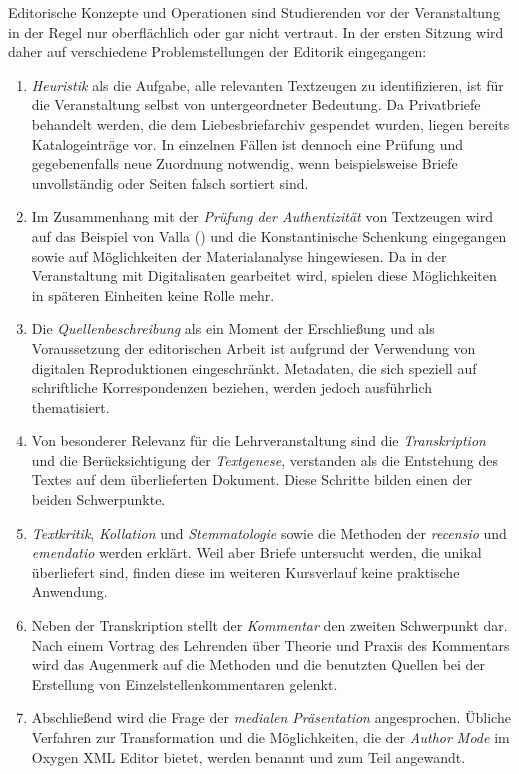 \documentclass[
          a4paper,
        ]{article}
\begin{document}
Editorische Konzepte und Operationen sind Studierenden vor der
Veranstaltung in der Regel nur oberflächlich oder gar nicht vertraut. In
der ersten Sitzung wird daher auf verschiedene Problemstellungen der
Editorik eingegangen:

\begin{enumerate}
\def\labelenumi{\arabic{enumi}.}
\item
  \emph{Heuristik} als die Aufgabe, alle relevanten Textzeugen zu
  identifizieren, ist für die Veranstaltung selbst von untergeordneter
  Bedeutung. Da Privatbriefe behandelt werden, die dem Liebesbriefarchiv
  gespendet wurden, liegen bereits Katalogeinträge vor. In einzelnen
  Fällen ist dennoch eine Prüfung und gegebenenfalls neue Zuordnung
  notwendig, wenn beispielsweise Briefe unvollständig oder Seiten falsch
  sortiert sind.
\item
  Im Zusammenhang mit der \emph{Prüfung der Authentizität} von
  Textzeugen wird auf das Beispiel von Valla
  () und die Konstantinische Schenkung
  eingegangen sowie auf Möglichkeiten der Materialanalyse hingewiesen.
  Da in der Veranstaltung mit Digitalisaten gearbeitet wird, spielen
  diese Möglichkeiten in späteren Einheiten keine Rolle mehr.
\item
  Die \emph{Quellenbeschreibung} als ein Moment der Erschließung und als
  Voraussetzung der editorischen Arbeit ist aufgrund der Verwendung von
  digitalen Reproduktionen eingeschränkt. Metadaten, die sich speziell
  auf schriftliche Korrespondenzen beziehen, werden jedoch ausführlich
  thematisiert.
\item
  Von besonderer Relevanz für die Lehrveranstaltung sind die
  \emph{Transkription} und die Berücksichtigung der \emph{Textgenese},
  verstanden als die Entstehung des Textes auf dem überlieferten
  Dokument. Diese Schritte bilden einen der beiden Schwerpunkte.
\item
  \emph{Textkritik}, \emph{Kollation} und \emph{Stemmatologie} sowie die
  Methoden der \emph{recensio} und \emph{emendatio} werden erklärt. Weil
  aber Briefe untersucht werden, die unikal überliefert sind, finden
  diese im weiteren Kursverlauf keine praktische Anwendung.
\item
  Neben der Transkription stellt der \emph{Kommentar} den zweiten
  Schwerpunkt dar. Nach einem Vortrag des Lehrenden über Theorie und
  Praxis des Kommentars wird das Augenmerk auf die Methoden und die
  benutzten Quellen bei der Erstellung von Einzelstellenkommentaren
  gelenkt.
\item
  Abschließend wird die Frage der \emph{medialen Präsentation}
  angesprochen. Übliche Verfahren zur Transformation und die
  Möglichkeiten, die der \emph{Author Mode} im Oxygen XML Editor bietet,
  werden benannt und zum Teil angewandt.
\end{enumerate}
\end{document}
